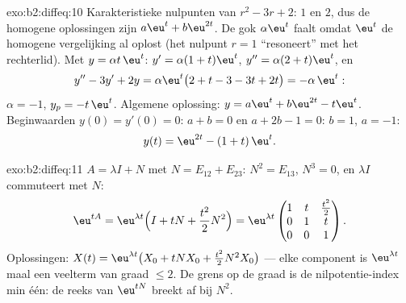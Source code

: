 \begin{solution}{exo:b2:diffeq:10}
Karakteristieke nulpunten van $r^2 - 3r + 2$: $1$ en $2$, dus de
homogene oplossingen zijn $a\eu^t + b\eu^{2t}$. De gok
$\alpha\eu^t$ faalt omdat $\eu^t$ de homogene vergelijking al
oplost (het nulpunt $r = 1$ ``resoneert'' met het rechterlid). Met
$y = \alpha t\,\eu^t$: $y' = \alpha(1 + t)\eu^t$, $y'' = \alpha(2 +
t)\eu^t$, en
\[
y'' - 3y' + 2y = \alpha\eu^t\bigl(2 + t - 3 - 3t + 2t\bigr)
= -\alpha\,\eu^t :
\]
$\alpha = -1$, $y_p = -t\,\eu^t$. Algemene oplossing: $y = a\eu^t +
b\eu^{2t} - t\eu^t$. Beginwaarden $y(0) = y'(0) = 0$: $a + b = 0$
en $a + 2b - 1 = 0$: $b = 1$, $a = -1$:
\[
y(t) = \eu^{2t} - (1 + t)\,\eu^{t} .
\]

\end{solution}

\begin{solution}{exo:b2:diffeq:11}
$A = \lambda I + N$ met $N = E_{12} + E_{23}$: $N^2 = E_{13}$, $N^3
= 0$, en $\lambda I$ commuteert met $N$:
\[
\eu^{tA} = \eu^{\lambda t}\Bigl(I + tN +
\frac{t^2}{2}N^2\Bigr)
= \eu^{\lambda t}\begin{pmatrix}
1 & t & \frac{t^2}{2}\\
0 & 1 & t\\
0 & 0 & 1
\end{pmatrix}.
\]
Oplossingen: $X(t) = \eu^{\lambda t}\bigl(X_0 + tNX_0 +
\frac{t^2}2N^2X_0\bigr)$ --- elke component is $\eu^{\lambda t}$
maal een veelterm van graad $\leq 2$. De grens op de graad is de
nilpotentie-index min één: de reeks van $\eu^{tN}$ breekt af bij
$N^2$.
\end{solution}

